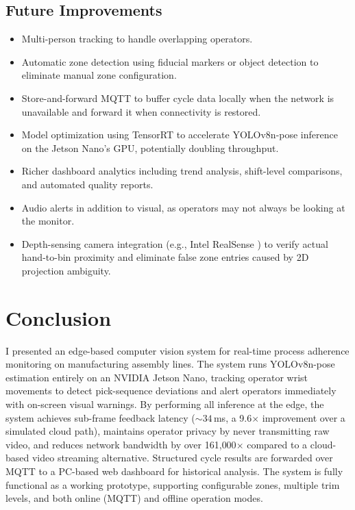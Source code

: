 \documentclass[conference]{IEEEtran}
\begin{document}
\subsection{Future Improvements}
\begin{itemize}
    \item Multi-person tracking to handle overlapping operators.
    \item Automatic zone detection using fiducial markers or object detection to eliminate manual zone configuration.
    \item Store-and-forward MQTT to buffer cycle data locally when the network is unavailable and forward it when connectivity is restored.
    \item Model optimization using TensorRT to accelerate YOLOv8n-pose inference on the Jetson Nano's GPU, potentially doubling throughput.
    \item Richer dashboard analytics including trend analysis, shift-level comparisons, and automated quality reports.
    \item Audio alerts in addition to visual, as operators may not always be looking at the monitor.
    \item Depth-sensing camera integration (e.g., Intel RealSense \cite{b12}) to verify actual hand-to-bin proximity and eliminate false zone entries caused by 2D projection ambiguity.
\end{itemize}

\section{Conclusion}
I presented an edge-based computer vision system for real-time process adherence monitoring on manufacturing assembly lines. The system runs YOLOv8n-pose estimation entirely on an NVIDIA Jetson Nano, tracking operator wrist movements to detect pick-sequence deviations and alert operators immediately with on-screen visual warnings. By performing all inference at the edge, the system achieves sub-frame feedback latency (${\sim}34$\,ms, a 9.6$\times$ improvement over a simulated cloud path), maintains operator privacy by never transmitting raw video, and reduces network bandwidth by over 161{,}000$\times$ compared to a cloud-based video streaming alternative. Structured cycle results are forwarded over MQTT to a PC-based web dashboard for historical analysis. The system is fully functional as a working prototype, supporting configurable zones, multiple trim levels, and both online (MQTT) and offline operation modes.
\end{document}
